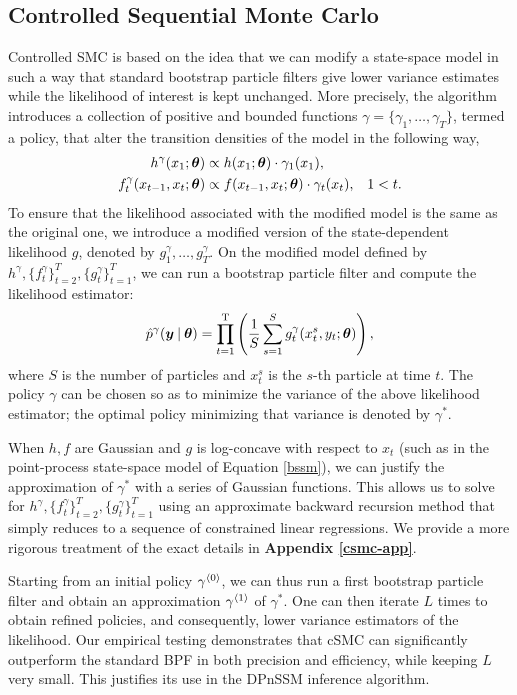 \documentclass[twoside]{article}
\begin{document}
\subsection{Controlled Sequential Monte Carlo} \label{ssec:csmc}
Controlled SMC is based on the idea that we can modify a state-space model in such a way that standard bootstrap particle filters \citep{doucet2001introduction} give lower variance estimates while the likelihood of interest is kept unchanged. More precisely, the algorithm introduces a collection of positive and bounded functions $\gamma = \{\gamma_1, \ldots, \gamma_T\}$, termed a policy, that alter the transition densities of the model in the following way,
\begin{align}
h^\gamma(x_1; \boldsymbol{\theta}) &\propto h(x_1; \boldsymbol{\theta}) \cdot \gamma_1(x_1), \\
f^\gamma_t(x_{t-1}, x_{t}; \boldsymbol{\theta}) &\propto f(x_{t-1}, x_t; \boldsymbol{\theta}) \cdot \gamma_t(x_t), & 1 < t. \nonumber
\end{align}
To ensure that the likelihood associated with the modified model is the same as the original one, we introduce a modified version of the state-dependent likelihood $g$, denoted by $g_{1}^{\gamma},\ldots,g_{T}^{\gamma}$. On the modified model defined by $h^{\gamma}, \{f_{t}^{\gamma}\}_{t=2}^T,\{g_{t}^{\gamma}\}_{t=1}^T$, we can run a bootstrap particle filter and compute the likelihood estimator:
\begin{align}
\hat{p}^{\gamma}(\boldsymbol{y} \:\vert\: \boldsymbol{\theta}) = \prod_{t=1}^\text{T} \left(\frac{1}{S} \sum_{s=1}^S g_t^\gamma(x_t^s, y_t; \boldsymbol{\theta})\right),
\end{align}
where $S$ is the number of particles and $x_t^s$ is the $s$-th particle at time $t$.  The policy $\gamma$ can be chosen so as to minimize the variance of the above likelihood estimator; the optimal policy minimizing that variance is denoted by $\gamma^{*}$.

When $h, f$ are Gaussian and $g$ is log-concave with respect to $x_t$ (such as in the point-process state-space model of Equation \ref{bssm}), we can justify the approximation of $\gamma^*$ with a series of Gaussian functions. This allows us to solve for $h^{\gamma}, \{f_{t}^{\gamma}\}_{t=2}^T,\{g_{t}^{\gamma}\}_{t=1}^T$ using an approximate backward recursion method that simply reduces to a sequence of constrained linear regressions. We provide a more rigorous treatment of the exact details in \textbf{Appendix \ref{csmc-app}}.  

Starting from an initial policy {$\gamma^{\langle0\rangle}_{}$}, we can thus run a first bootstrap particle filter and obtain an approximation {$\gamma^{\langle1\rangle}_{}$} of $\gamma^{*}$. One can then iterate $L$ times to obtain refined policies, and consequently, lower variance estimators of the likelihood. Our empirical testing demonstrates that cSMC can significantly outperform the standard BPF in both precision and efficiency, while keeping $L$ very small. This justifies its use in the DPnSSM inference algorithm.
\end{document}
